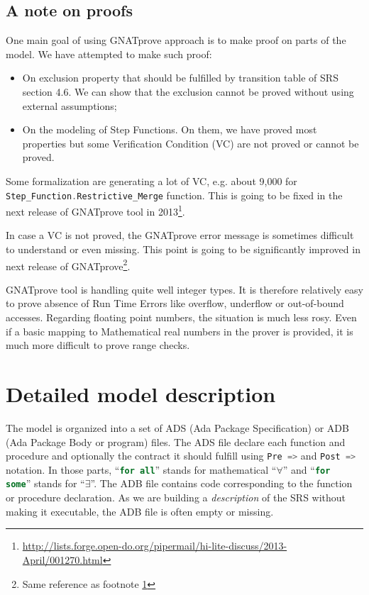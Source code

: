 \documentclass{template/openetcs_report}
\newcommand{\Ada}[1]{\lstinline[language=Ada,basicstyle={\sffamily},framesep=0pt]{#1}}
\begin{document}
\section{A note on proofs}

One main goal of using GNATprove approach is to make proof on parts of
the model. We have attempted to make such proof:
\begin{itemize}
\item On exclusion property that should be fulfilled by transition
  table of SRS section 4.6. We can show that the exclusion cannot be
  proved without using external assumptions;
\item On the modeling of Step Functions. On them, we have proved most
  properties but some Verification Condition (VC) are not proved or
  cannot be proved.
\end{itemize}

Some formalization are generating a lot of VC, e.g. about 9,000 for
\Ada{Step_Function.Restrictive_Merge} function. This is going to be
fixed in the next release of GNATprove tool in
2013\footnote{\label{fn:gnatprove-improvements}\url{http://lists.forge.open-do.org/pipermail/hi-lite-discuss/2013-April/001270.html}}.

In case a VC is not proved, the GNATprove error message is sometimes
difficult to understand or even missing. This point is going to be
significantly improved in next release of GNATprove\footnote{Same
  reference as footnote \ref{fn:gnatprove-improvements}}.

GNATprove tool is handling quite well integer types. It is therefore
relatively easy to prove absence of Run Time Errors like overflow,
underflow or out-of-bound accesses. Regarding floating point numbers,
the situation is much less rosy. Even if a basic mapping to
Mathematical real numbers in the prover is provided, it is much more
difficult to prove range checks.

\chapter{Detailed model description}

The model is organized into a set of ADS (Ada Package Specification)
or ADB (Ada Package Body or program) files. The ADS file declare each
function and procedure and optionally the contract it should fulfill
using \Ada{Pre =>} and \Ada{Post =>} notation. In those parts,
``\Ada{for all}'' stands for mathematical ``$\forall$'' and ``\Ada{for
  some}'' stands for ``$\exists$''. The ADB file contains code
corresponding to the function or procedure declaration. As we are
building a \emph{description} of the SRS without making it executable,
the ADB file is often empty or missing.
\end{document}

